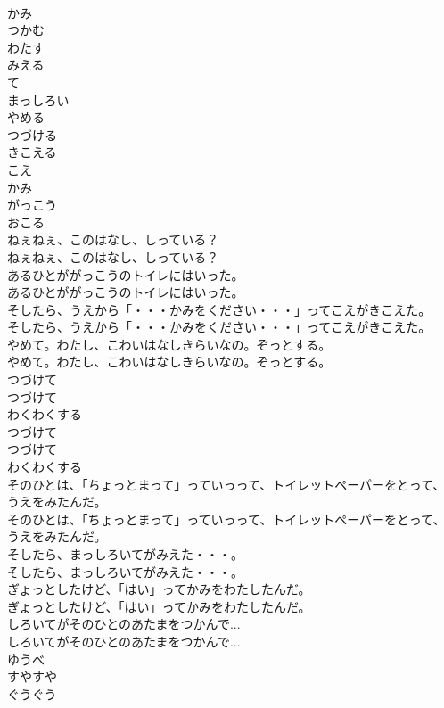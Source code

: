\documentclass[8pt]{extreport}
\begin{document}
\begin{CJK}{UTF8}{min}
\\	かみ
\\	つかむ
\\	わたす
\\	みえる
\\	て
\\	まっしろい
\\	やめる
\\	つづける
\\	きこえる
\\	こえ
\\	かみ
\\	がっこう
\\	おこる
\\	ねぇねぇ、このはなし、しっている？
\\	ねぇねぇ、このはなし、しっている？
\\	あるひとががっこうのトイレにはいった。
\\	あるひとががっこうのトイレにはいった。
\\	そしたら、うえから「・・・かみをください・・・」ってこえがきこえた。
\\	そしたら、うえから「・・・かみをください・・・」ってこえがきこえた。
\\	やめて。わたし、こわいはなしきらいなの。ぞっとする。
\\	やめて。わたし、こわいはなしきらいなの。ぞっとする。
\\	つづけて
\\	つづけて
\\	わくわくする
\\	つづけて
\\	つづけて
\\	わくわくする
\\	そのひとは、「ちょっとまって」っていっって、トイレットペーパーをとって、うえをみたんだ。
\\	そのひとは、「ちょっとまって」っていっって、トイレットペーパーをとって、うえをみたんだ。
\\	そしたら、まっしろいてがみえた・・・。
\\	そしたら、まっしろいてがみえた・・・。
\\	ぎょっとしたけど、「はい」ってかみをわたしたんだ。
\\	ぎょっとしたけど、「はい」ってかみをわたしたんだ。
\\	しろいてがそのひとのあたまをつかんで...
\\	しろいてがそのひとのあたまをつかんで...
\\	ゆうべ
\\	すやすや
\\	ぐうぐう

\end{CJK}
\end{document}
